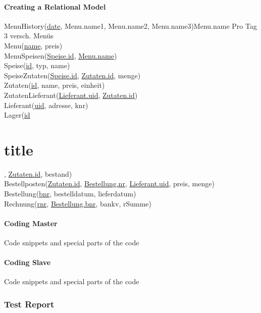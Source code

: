 \documentclass[11pt,a4paper]{article}
\begin{document}
\subsection{Creating a Relational Model}
MenuHistory(\underline{date}, Menu.name1, Menu.name2, Menu.name3)Menu.name Pro Tag 3 versch. Menüs \\
Menu(\underline{name}, preis) \\
MenuSpeisen(\underline{Speise.id}, \underline{Menu.name}) \\
Speise(\underline{id}, typ, name) \\
SpeiseZutaten(\underline{Speise.id}, \underline{Zutaten.id}, menge) \\
Zutaten(\underline{id}, name, preis, einheit) \\
ZutatenLieferant(\underline{Lieferant.uid}, \underline{Zutaten.id}) \\
Lieferant(\underline{uid}, adresse, knr) \\
Lager(\underline{id}\part{title}, \underline{Zutaten.id}, bestand) \\
Bestellposten(\underline{Zutaten.id}, \underline{Bestellung.nr}, \underline{Lieferant.uid}, preis, menge) \\
Bestellung(\underline{bnr}, bestelldatum, lieferdatum) \\
Rechnung(\underline{rnr}, \underline{Bestellung.bnr}, bankv, rSumme) \\

\subsection{Coding Master}
Code snippets and special parts of the code
\subsection{Coding Slave}
Code snippets and special parts of the code
\newpage

\section{Test Report}
\newpage



\end{document}
